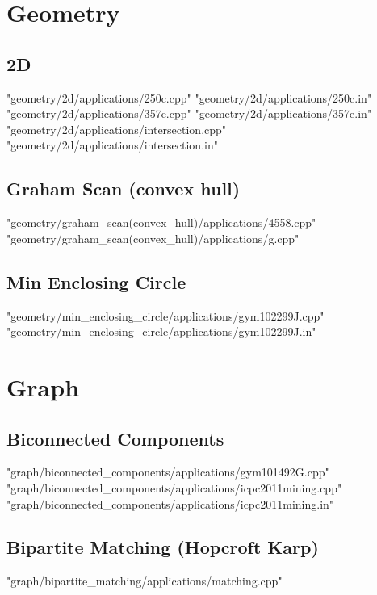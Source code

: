 \documentclass [12pt,onecolumn,oneside]{article}
\begin{document}
\newpage

\section{Geometry}
\subsection{ 2D}
 {"geometry/2d/applications/250c.cpp"}
 {"geometry/2d/applications/250c.in"}
 {"geometry/2d/applications/357e.cpp"}
 {"geometry/2d/applications/357e.in"}
 {"geometry/2d/applications/intersection.cpp"}
 {"geometry/2d/applications/intersection.in"}
\subsection{ Graham Scan (convex hull)}
 {"geometry/graham_scan(convex_hull)/applications/4558.cpp"}
 {"geometry/graham_scan(convex_hull)/applications/g.cpp"}
\subsection{ Min Enclosing Circle}
 {"geometry/min_enclosing_circle/applications/gym102299J.cpp"}
 {"geometry/min_enclosing_circle/applications/gym102299J.in"}
\newpage

\section{Graph}
\subsection{ Biconnected Components}
 {"graph/biconnected_components/applications/gym101492G.cpp"}
 {"graph/biconnected_components/applications/icpc2011mining.cpp"}
 {"graph/biconnected_components/applications/icpc2011mining.in"}
\subsection{ Bipartite Matching (Hopcroft Karp)}
 {"graph/bipartite_matching/applications/matching.cpp"}
\end{document}

